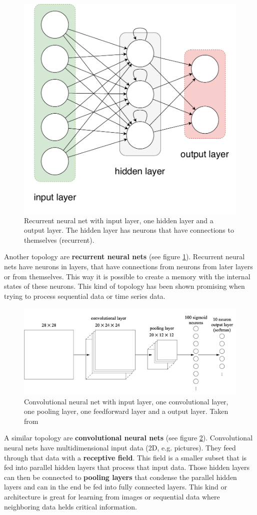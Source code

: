 \documentclass[jou,apacite]{apa6}
\begin{document}
\begin{figure}[!htb]
\centering
\includegraphics[width=.3\textwidth]{recurrent-neural-net.pdf}
\caption[Recurrent neural net]{Recurrent neural net with input layer, one hidden layer and a output layer. The hidden layer has neurons that have connections to themselves (recurrent).}
\label{fig:rnn}
\end{figure}

Another topology are \textbf{recurrent neural nets} (see figure \ref{fig:rnn}). Recurrent neural nets have neurons in layers, that have connections from neurons from later layers or from themselves. This way it is possible to create a memory with the internal states of these neurons. This kind of topology has been shown promising when trying to process sequential data or time series data.

\begin{figure}[!htb]
\centering
\includegraphics[width=.45\textwidth]{simple_conv.png}
\caption[Convolutional neural net]{Convolutional neural net with input layer, one convolutional layer, one pooling layer, one feedforward layer and a output layer. 
Taken from~\protect\cite[Ch. 6]{nielsen2015}}
\label{fig:cnn}
\end{figure}

A similar topology are \textbf{convolutional neural nets} (see figure \ref{fig:cnn}). Convolutional neural nets have multidimensional input data (2D, e.g. pictures). They feed through that data with a \textbf{receptive field}. This field is a smaller subset that is fed into parallel hidden layers that process that input data. Those hidden layers can then be connected to \textbf{pooling layers} that condense the parallel hidden layers and can in the end be fed into fully connected layers. This kind or architecture is great for learning from images or sequential data where neighboring data helds critical information.
\end{document}
